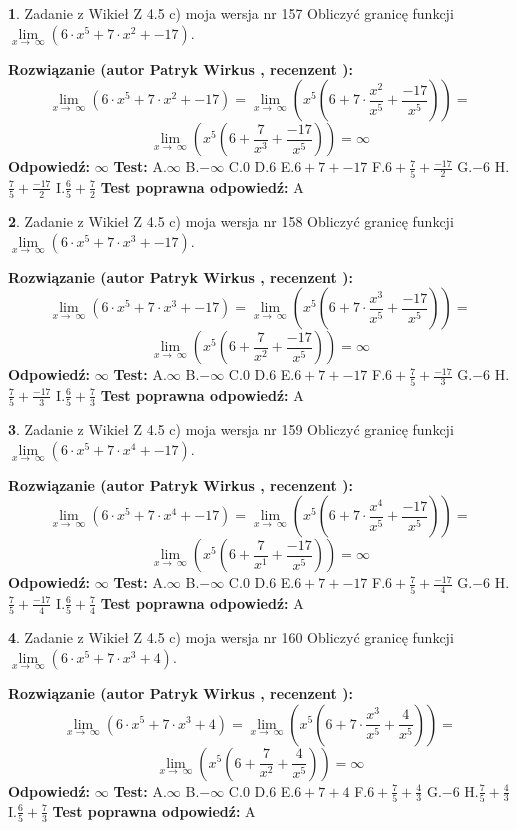 \documentclass[12pt, a4paper]{article}
\theoremstyle{definition} %
\newtheorem{zad}{}
\newcommand{\zadStart}[1]{\begin{zad}#1\newline}
\newcommand{\zadStop}{\end{zad}}
\newcommand{\rozwStart}[2]{\noindent \textbf{Rozwiązanie (autor #1 , recenzent #2): }\newline}
\newcommand{\rozwStop}{\newline}
\newcommand{\odpStart}{\noindent \textbf{Odpowiedź:}\newline}
\newcommand{\odpStop}{\newline}
\newcommand{\testStart}{\noindent \textbf{Test:}\newline}
\newcommand{\testStop}{\newline}
\newcommand{\kluczStart}{\noindent \textbf{Test poprawna odpowiedź:}\newline}
\newcommand{\kluczStop}{\newline}
\begin{document}
\zadStart{Zadanie z Wikieł Z 4.5 c) moja wersja nr 157}
Obliczyć granicę funkcji  $\lim\limits_{x\to\ \infty}(6 \cdot x^{5}+7 \cdot x^{2}+-17)$.
\zadStop
\rozwStart{Patryk Wirkus}{}
$$\lim\limits_{x\to\ \infty}(6 \cdot x^{5}+7 \cdot x^{2}+-17) = \lim\limits_{x\to\ \infty}(x^{5}(6 +7 \cdot \frac{x^{2}}{x^{5}}+\frac{-17}{x^{5}})) =$$ $$\lim\limits_{x\to\ \infty}(x^{5}(6 +\frac{7}{x^{3}}+\frac{-17}{x^{5}})) =\infty$$
\rozwStop
\odpStart
$\infty$
\odpStop
\testStart
A.$\infty$ B.$-\infty$ C.$0$ D.$6$ E.$6 + 7 + -17$
F.$6+\frac{7}{5}+\frac{-17}{2}$ G.$-6$
H.$\frac{7}{5}+\frac{-17}{2}$
I.$\frac{6}{5}+\frac{7}{2}$
\testStop
\kluczStart
A
\kluczStop



\zadStart{Zadanie z Wikieł Z 4.5 c) moja wersja nr 158}
Obliczyć granicę funkcji  $\lim\limits_{x\to\ \infty}(6 \cdot x^{5}+7 \cdot x^{3}+-17)$.
\zadStop
\rozwStart{Patryk Wirkus}{}
$$\lim\limits_{x\to\ \infty}(6 \cdot x^{5}+7 \cdot x^{3}+-17) = \lim\limits_{x\to\ \infty}(x^{5}(6 +7 \cdot \frac{x^{3}}{x^{5}}+\frac{-17}{x^{5}})) =$$ $$\lim\limits_{x\to\ \infty}(x^{5}(6 +\frac{7}{x^{2}}+\frac{-17}{x^{5}})) =\infty$$
\rozwStop
\odpStart
$\infty$
\odpStop
\testStart
A.$\infty$ B.$-\infty$ C.$0$ D.$6$ E.$6 + 7 + -17$
F.$6+\frac{7}{5}+\frac{-17}{3}$ G.$-6$
H.$\frac{7}{5}+\frac{-17}{3}$
I.$\frac{6}{5}+\frac{7}{3}$
\testStop
\kluczStart
A
\kluczStop



\zadStart{Zadanie z Wikieł Z 4.5 c) moja wersja nr 159}
Obliczyć granicę funkcji  $\lim\limits_{x\to\ \infty}(6 \cdot x^{5}+7 \cdot x^{4}+-17)$.
\zadStop
\rozwStart{Patryk Wirkus}{}
$$\lim\limits_{x\to\ \infty}(6 \cdot x^{5}+7 \cdot x^{4}+-17) = \lim\limits_{x\to\ \infty}(x^{5}(6 +7 \cdot \frac{x^{4}}{x^{5}}+\frac{-17}{x^{5}})) =$$ $$\lim\limits_{x\to\ \infty}(x^{5}(6 +\frac{7}{x^{1}}+\frac{-17}{x^{5}})) =\infty$$
\rozwStop
\odpStart
$\infty$
\odpStop
\testStart
A.$\infty$ B.$-\infty$ C.$0$ D.$6$ E.$6 + 7 + -17$
F.$6+\frac{7}{5}+\frac{-17}{4}$ G.$-6$
H.$\frac{7}{5}+\frac{-17}{4}$
I.$\frac{6}{5}+\frac{7}{4}$
\testStop
\kluczStart
A
\kluczStop



\zadStart{Zadanie z Wikieł Z 4.5 c) moja wersja nr 160}
Obliczyć granicę funkcji  $\lim\limits_{x\to\ \infty}(6 \cdot x^{5}+7 \cdot x^{3}+4)$.
\zadStop
\rozwStart{Patryk Wirkus}{}
$$\lim\limits_{x\to\ \infty}(6 \cdot x^{5}+7 \cdot x^{3}+4) = \lim\limits_{x\to\ \infty}(x^{5}(6 +7 \cdot \frac{x^{3}}{x^{5}}+\frac{4}{x^{5}})) =$$ $$\lim\limits_{x\to\ \infty}(x^{5}(6 +\frac{7}{x^{2}}+\frac{4}{x^{5}})) =\infty$$
\rozwStop
\odpStart
$\infty$
\odpStop
\testStart
A.$\infty$ B.$-\infty$ C.$0$ D.$6$ E.$6 + 7 + 4$
F.$6+\frac{7}{5}+\frac{4}{3}$ G.$-6$
H.$\frac{7}{5}+\frac{4}{3}$
I.$\frac{6}{5}+\frac{7}{3}$
\testStop
\kluczStart
A
\kluczStop
\end{document}
